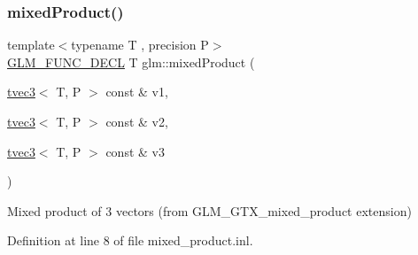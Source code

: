 \subsubsection{\texorpdfstring{mixedProduct()}{mixedProduct()}}
{\footnotesize\ttfamily template$<$typename T , precision P$>$ \\
\mbox{\hyperlink{setup_8hpp_ab2d052de21a70539923e9bcbf6e83a51}{G\+L\+M\+\_\+\+F\+U\+N\+C\+\_\+\+D\+E\+CL}} T glm\+::mixed\+Product (\begin{DoxyParamCaption}\item[{\mbox{\hyperlink{structglm_1_1tvec3}{tvec3}}$<$ T, P $>$ const \&}]{v1,  }\item[{\mbox{\hyperlink{structglm_1_1tvec3}{tvec3}}$<$ T, P $>$ const \&}]{v2,  }\item[{\mbox{\hyperlink{structglm_1_1tvec3}{tvec3}}$<$ T, P $>$ const \&}]{v3 }\end{DoxyParamCaption})}



Mixed product of 3 vectors (from G\+L\+M\+\_\+\+G\+T\+X\+\_\+mixed\+\_\+product extension) 



Definition at line 8 of file mixed\+\_\+product.\+inl.

